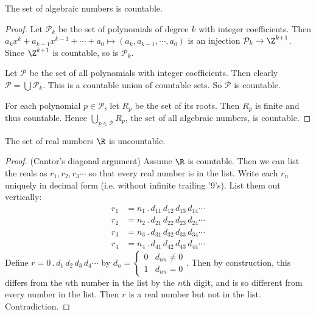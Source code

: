 \documentclass[a4paper]{article}
\begin{document}
  \begin{thm}
    The set of algebraic numbers is countable.
  \end{thm}
  \begin{proof}
    Let $\mathcal{P}_k$ be the set of polynomials of degree $k$ with integer coefficients. Then  $a_kx^k + a_{k - 1}x^{k - 1} + \cdots + a_0 \mapsto (a_k, a_{k - 1}, \cdots, a_0)$ is an injection $\mathcal{P}_k \to \Z^{k + 1}$. Since $\Z^{k + 1}$ is countable, so is $\mathcal{P}_k$.

    Let $\mathcal{P}$ be the set of all polynomials with integer coefficients. Then clearly $\mathcal{P} = \bigcup \mathcal{P}_k$. This is a countable union of countable sets. So $\mathcal{P}$ is countable.

    For each polynomial $p \in \mathcal{P}$, let $R_p$ be the set of its roots. Then $R_p$ is finite and thus countable. Hence $\bigcup_{p\in \mathcal{P}} R_p$, the set of all algebraic numbers, is countable.
  \end{proof}

  \begin{thm}
    The set of real numbers $\R$ is uncountable. 
  \end{thm}

  \begin{proof}
    (Cantor's diagonal argument) Assume $\R$ is countable. Then we can list the reals as $r_1,r_2,r_3\cdots$ so that every real number is in the list. Write each $r_n$ uniquely in decimal form (i.e. without infinite trailing '9's). List them out vertically:
    \begin{align*}
      r_1 &= n_1\,.\,d_{11}\,d_{12}\,d_{13}\,d_{14}\cdots\\
      r_2 &= n_2\,.\,d_{21}\,d_{22}\,d_{23}\,d_{24}\cdots\\
      r_3 &= n_3\,.\,d_{31}\,d_{32}\,d_{33}\,d_{34}\cdots\\
      r_4 &= n_4\,.\,d_{41}\,d_{42}\,d_{43}\,d_{44}\cdots
    \end{align*}
    Define $r = 0\,.\,d_1\,d_2\,d_3\,d_4\cdots$ by $d_n = 
    \begin{cases}
      0 & d_{nn}\not= 0\\
      1 & d_{nn}=0
    \end{cases}$. Then by construction, this differs from the $n$th number in the list by the $n$th digit, and is so different from every number in the list. Then $r$ is a real number but not in the list. Contradiction.
  \end{proof}
\end{document}
